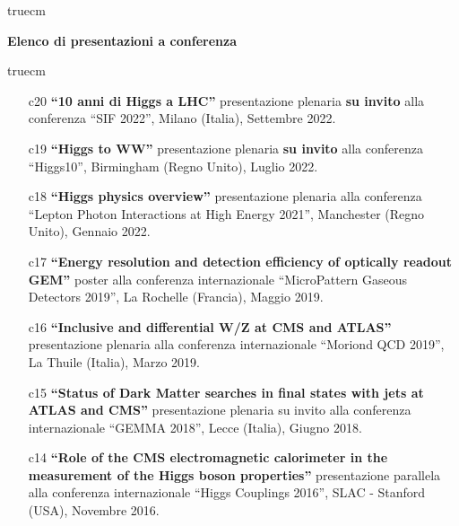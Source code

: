 \documentclass[11pt,twoside,a4paper]{article}
\begin{document}
 truecm
\begin{center}
{\bf{Elenco di presentazioni a conferenza}}
\end{center}
 truecm

\begin{enumerate}

\item[c20] \textbf{``10 anni di Higgs a LHC''} presentazione
  plenaria \textbf{su invito} alla conferenza ``SIF 2022'', Milano (Italia), Settembre 2022.
  \vspace{2mm}

\item[c19] \textbf{``Higgs to WW''} presentazione
  plenaria \textbf{su invito} alla conferenza ``Higgs10'', Birmingham (Regno Unito), Luglio 2022.
  \vspace{2mm}
  
\item[c18] \textbf{``Higgs physics overview''} presentazione
    plenaria alla conferenza ``Lepton Photon Interactions at High
    Energy 2021'', Manchester (Regno Unito), Gennaio 2022.
  \vspace{2mm}
    
\item [c17] \textbf{``Energy resolution and detection efficiency of
  optically readout GEM''} poster alla conferenza internazionale
  ``MicroPattern Gaseous Detectors 2019'', La Rochelle (Francia),
  Maggio 2019.
  \vspace{2mm}

\item [c16] \textbf{``Inclusive and differential W/Z at CMS and ATLAS''}
  presentazione plenaria alla conferenza internazionale ``Moriond QCD
  2019'', La Thuile (Italia), Marzo 2019.
  \vspace{2mm}

\item [c15] \textbf{``Status of Dark Matter searches in final states with
  jets at ATLAS and CMS''} presentazione plenaria su invito alla
  conferenza internazionale ``GEMMA 2018'', Lecce (Italia), Giugno 2018.
  \vspace{2mm}

\item [c14] \textbf{``Role of the CMS electromagnetic calorimeter in the
  measurement of the Higgs boson properties''} presentazione parallela
  alla conferenza internazionale ``Higgs Couplings 2016'', SLAC -
  Stanford (USA), Novembre 2016.
  \vspace{2mm}


\end{enumerate}
\end{document}
